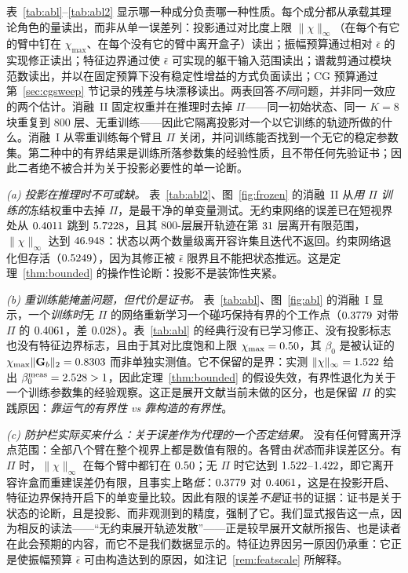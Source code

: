 \documentclass[UTF8,a4paper,11pt]{ctexart}
\newcommand{\norm}[1]{\lVert #1 \rVert}
\newcommand{\infn}[1]{\lVert #1 \rVert_{\infty}}
\newcommand{\numv}[1]{#1}
\begin{document}
\noindent
表~\ref{tab:abl}--\ref{tab:abl2} 显示哪一种成分负责哪一种性质。每个成分都从承载其理论角色的量读出，而非从单一误差列：投影通过对比度上限 $\infn{\chi}$（在每个有它的臂中钉在 $\chi_{\max}$、在每个没有它的臂中离开盒子）读出；振幅预算通过相对 $\bar\epsilon$ 的实现修正读出；特征边界通过使 $\bar\epsilon$ 可实现的躯干输入范围读出；谱裁剪通过模块范数读出，并以在固定预算下没有稳定性增益的方式负面读出；CG 预算通过第~\ref{sec:cgsweep} 节记录的残差与块漂移读出。两表回答\emph{不同}问题，并非同一效应的两个估计。消融~II 固定权重并在推理时去掉 $\Pi$——同一初始状态、同一 $K{=}8$ 块重复到 $800$ 层、无重训练——因此它隔离投影对一个以它训练的轨迹所做的什么。消融~I 从零重训练每个臂且 $\Pi$ 关闭，并问训练能否找到一个无它的稳定参数集。第二种中的有界结果是训练所落参数集的经验性质，且不带任何先验证书；因此二者绝不被合并为关于投影必要性的单一论断。

\emph{(a) 投影在推理时不可或缺。} 表~\ref{tab:abl2}、图~\ref{fig:frozen} 的消融~II 从\emph{用 $\Pi$ 训练的}冻结权重中去掉 $\Pi$，是最干净的单变量测试。无约束网络的误差已在短视界处从 $\numv{\NumFrzUncOn}$ 跳到 $\numv{\NumFrzUncOffShort}$，且其 $800$-层展开轨迹在第 $\numv{\NumFrzUncBreak}$ 层离开有限范围，$\infn{\chi}$ 达到 $\numv{\NumFrzUncOffChi}$：状态以两个数量级离开容许集且迭代不返回。约束网络退化但存活（$\numv{\NumFrzConsOff}$），因为其修正被 $\bar\epsilon$ 限界且不能把状态推远。这是定理~\ref{thm:bounded} 的操作性论断：投影不是装饰性夹紧。

\emph{(b) 重训练能掩盖问题，但代价是证书。} 表~\ref{tab:abl}、图~\ref{fig:abl} 的消融~I 显示，一个\emph{训练时}无 $\Pi$ 的网络重新学习一个碰巧保持有界的个工作点（$\numv{\NumAblUncPOffFbOnRre}$ 对带 $\Pi$ 的 $\numv{\NumAblUncPOnFbOnRre}$，差 $\numv{\NumAblProjDelta}$）。表~\ref{tab:abl} 的经典行没有已学习修正、没有投影标志也没有特征边界标志，且由于其对比度饱和上限 $\chi_{\max}=\numv{\chimax}$，其 $\beta_0$ 是被认证的 $\chi_{\max}\norm{\mathbf{G}_b}_2=\numv{\betacert}$ 而非单独实测值。它不保留的是界：实测 $\infn{\chi}=\numv{\NumAblUncPOffFbOnChi}$ 给出 $\beta_0^{\mathrm{meas}}=\numv{\NumBetaMeas}>1$，因此定理~\ref{thm:bounded} 的假设失效，有界性退化为关于一个训练参数集的经验观察。这正是展开文献当前未做的区分，也是保留 $\Pi$ 的实践原因：\emph{靠运气的有界性 vs 靠构造的有界性}。

\emph{(c) 防护栏实际买来什么：关于误差作为代理的一个否定结果。} 没有任何臂离开浮点范围：全部八个臂在整个视界上都是数值有限的。各臂由\emph{状态}而非误差区分。有 $\Pi$ 时，$\infn{\chi}$ 在每个臂中都钉在 $\numv{\chimax}$；无 $\Pi$ 时它达到 $\numv{\NumAblUncPOffFbOnChi}$--$\numv{\NumAblUncPOffFbOffChi}$，即它离开容许盒而重建误差仍有限，且事实上略\emph{低}：$\numv{\NumAblUncPOffFbOnRre}$ 对 $\numv{\NumAblUncPOnFbOnRre}$，这是在投影开启、特征边界保持开启下的单变量比较。因此有限的误差\emph{不是}证书的证据：证书是关于状态的论断，且是投影、而非观测到的精度，强制了它。我们显式报告这一点，因为相反的读法——“无约束展开轨迹发散”——正是较早展开文献所报告、也是读者在此会预期的内容，而它不是我们数据显示的。特征边界因另一原因仍承重：它正是使振幅预算 $\bar\epsilon$ 可由构造达到的原因，如注记~\ref{rem:featscale} 所解释。
\end{document}
